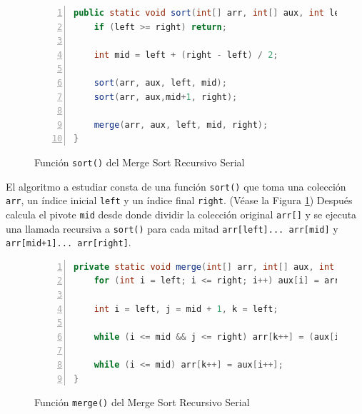 \documentclass[titlepage]{article}
\begin{document}
\begin{figure}[h]
    \begin{lstlisting}[language=java, frame=single, numbers=left]
public static void sort(int[] arr, int[] aux, int left, int right) {
	if (left >= right) return;
	
	int mid = left + (right - left) / 2;
	
	sort(arr, aux, left, mid);
	sort(arr, aux,mid+1, right);
	
	merge(arr, aux, left, mid, right);
}
    \end{lstlisting}
    \caption{Función \lstinline{sort()} del Merge Sort Recursivo Serial}
    \label{fig:MSRS_sort()}
\end{figure}


El algoritmo a estudiar consta de una función \lstinline|sort()| que toma una colección \lstinline|arr|, un índice inicial \lstinline|left| y un índice final \lstinline|right|. (Véase la Figura \ref{fig:MSRS_sort()}) Después calcula el pivote \lstinline|mid| desde donde dividir la colección original \lstinline|arr[]| y se ejecuta una llamada recursiva a \lstinline|sort()| para cada mitad \lstinline|arr[left]... arr[mid]| y \lstinline|arr[mid+1]... arr[right]|.

\begin{figure}[h]
    \begin{lstlisting}[language=java, frame=single, numbers=left]
private static void merge(int[] arr, int[] aux, int left, int mid, int right) {
	for (int i = left; i <= right; i++) aux[i] = arr[i];
	
	int i = left, j = mid + 1, k = left;
	
	while (i <= mid && j <= right) arr[k++] = (aux[i] <= aux[j])? aux[i++] : aux[j++];
	
	while (i <= mid) arr[k++] = aux[i++];
}
    \end{lstlisting}
    \caption{Función \lstinline{merge()} del Merge Sort Recursivo Serial}
    \label{fig:MSRS_merge()}
\end{figure}
\end{document}
